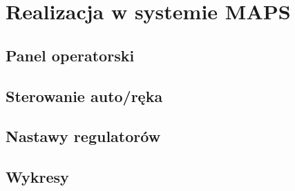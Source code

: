 \documentclass{mwrep}
\begin{document}
\chapter{Realizacja w systemie MAPS}
\label{MAPS}

\section{Panel operatorski}
\label{MAPS::PanelOperatorski}

\section{Sterowanie auto/ręka}
\label{MAPS::AutoReka}

\section{Nastawy regulatorów}
\label{MAPS::Nastawy}

\section{Wykresy}
\label{MAPS::Wykresy}
\end{document}
